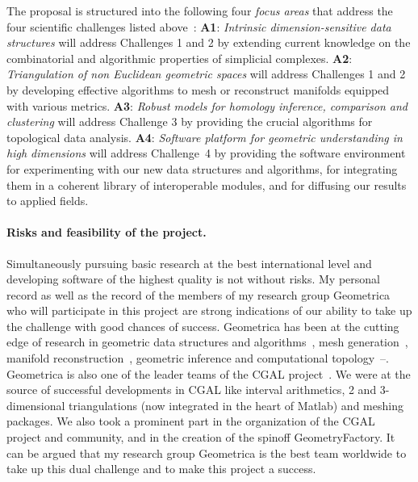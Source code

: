 The proposal is structured into the following four {\em focus areas}  that address the four scientific challenges listed above~:
{\bf A1}:  {\em Intrinsic dimension-sensitive data  structures} will address Challenges 1 and 2 by extending current knowledge on the combinatorial and algorithmic properties of simplicial complexes. 
  {\bf A2}:  {\em Triangulation of non Euclidean geometric spaces} will address Challenges 1 and 2 by developing effective algorithms to mesh or reconstruct manifolds equipped with various metrics.   {\bf A3}: {\em Robust models for homology inference, comparison and  clustering} will address Challenge 3 by providing the crucial  algorithms for topological data analysis.
 {\bf A4}:  {\em  Software platform for geometric understanding in high dimensions} will address Challenge~4 by providing the software environment for experimenting with our new data structures and algorithms, for integrating them in a coherent library of interoperable modules, and for diffusing our results to applied fields. 

\paragraph{Risks and feasibility of the project.} 
Simultaneously pursuing basic research at the best international level and developing software of the highest quality is not without risks. %
My personal record as well as the record of the members of my research group Geometrica who will participate in this project are strong indications of our ability to take up the challenge with good chances of success.  Geometrica has been at the cutting edge of research in geometric data structures and algorithms~\cite{by-ag-98}, mesh generation~\cite{geometrica-ecg-book}, manifold reconstruction~\cite{geometrica-7142i,geometrica-bgo-09}, geometric inference and computational topology~\cite{geometrica-ccl09}--\cite{geometrica-cseh-07}. Geometrica is also one of the leader teams of the CGAL project~\cite{cgal}.  We were at the source of successful developments in CGAL like interval arithmetics, 2 and 3-dimensional triangulations (now integrated in the heart of Matlab) and meshing packages. We also took a prominent part in the organization of the CGAL project and community, and in the creation of the spinoff GeometryFactory. It can be argued that  my research group Geometrica is the best team worldwide to take up this dual challenge and to make this project a success. 


